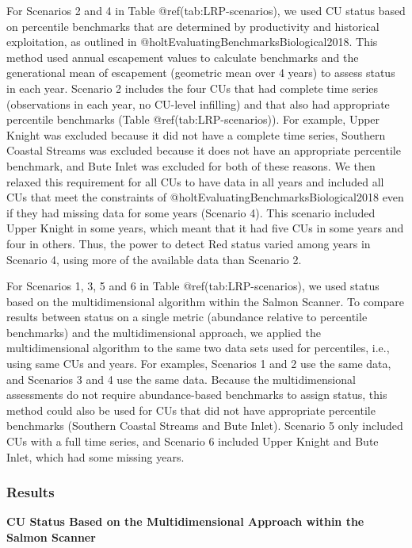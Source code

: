 \documentclass[
]{article}
\begin{document}
For Scenarios 2 and 4 in Table @ref(tab:LRP-scenarios), we used CU
status based on percentile benchmarks that are determined by
productivity and historical exploitation, as outlined in
@holtEvaluatingBenchmarksBiological2018. This method used annual
escapement values to calculate benchmarks and the generational mean of
escapement (geometric mean over 4 years) to assess status in each year.
Scenario 2 includes the four CUs that had complete time series
(observations in each year, no CU-level infilling) and that also had
appropriate percentile benchmarks (Table @ref(tab:LRP-scenarios)). For
example, Upper Knight was excluded because it did not have a complete
time series, Southern Coastal Streams was excluded because it does not
have an appropriate percentile benchmark, and Bute Inlet was excluded
for both of these reasons. We then relaxed this requirement for all CUs
to have data in all years and included all CUs that meet the constraints
of @holtEvaluatingBenchmarksBiological2018 even if they had missing data
for some years (Scenario 4). This scenario included Upper Knight in some
years, which meant that it had five CUs in some years and four in
others. Thus, the power to detect Red status varied among years in
Scenario 4, using more of the available data than Scenario 2.

For Scenarios 1, 3, 5 and 6 in Table @ref(tab:LRP-scenarios), we used
status based on the multidimensional algorithm within the Salmon
Scanner. To compare results between status on a single metric (abundance
relative to percentile benchmarks) and the multidimensional approach, we
applied the multidimensional algorithm to the same two data sets used
for percentiles, i.e., using same CUs and years. For examples, Scenarios
1 and 2 use the same data, and Scenarios 3 and 4 use the same data.
Because the multidimensional assessments do not require abundance-based
benchmarks to assign status, this method could also be used for CUs that
did not have appropriate percentile benchmarks (Southern Coastal Streams
and Bute Inlet). Scenario 5 only included CUs with a full time series,
and Scenario 6 included Upper Knight and Bute Inlet, which had some
missing years.

\hypertarget{results}{%
\subsubsection{Results}\label{results}}

\textbf{CU Status Based on the Multidimensional Approach within the
Salmon Scanner}
\end{document}
